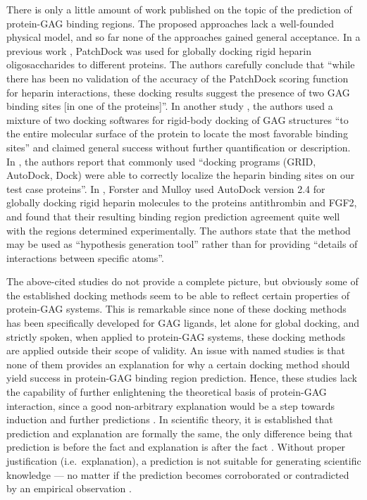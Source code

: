 There is only a little amount of work published on the topic of the prediction
of protein-GAG binding regions. The proposed approaches lack a well-founded
physical model, and so far none of the approaches gained general acceptance. In
a previous work \cite{gandhi_bmp_heparin_binding_sites_2012}, PatchDock
\cite{patchdock_2002} was used for globally docking rigid heparin
oligosaccharides to different proteins. The authors carefully conclude that
\enquote{while there has been no validation of the accuracy of the PatchDock
scoring function for heparin interactions, these docking results suggest the
presence of two GAG binding sites [in one of the proteins]}. In another study
\cite{rogers_gag_prot_prot_2011}, the authors used a mixture of two docking
softwares for rigid-body docking of GAG structures
\enquote{to the entire molecular surface of the protein to locate the most
favorable binding sites} and claimed general success without further
quantification or description. In \cite{bitomsky_gag_docking_1999}, the authors
report that commonly used
\enquote{docking programs (GRID, AutoDock, Dock) were able to
correctly localize the heparin binding sites on our test case proteins}. In
\cite{hp_binding_sites_mulloy_2006}, Forster and Mulloy used AutoDock version
2.4 \cite{autodock24} for globally docking rigid heparin molecules to the
proteins antithrombin and FGF2, and found that their resulting binding region
prediction agreement quite well with the regions determined experimentally. The
authors state that the method may be used as \enquote{hypothesis generation
tool} rather than for providing
\enquote{details of interactions between specific atoms}.

The above-cited studies do not provide a complete picture, but obviously some of
the established docking methods seem to be able to reflect certain properties of
protein-GAG systems. This is remarkable since none of these docking methods has
been specifically developed for GAG ligands, let alone for global docking, and
strictly spoken, when applied to protein-GAG systems, these docking methods are
applied outside their scope of validity. An issue with named studies is that
none of them provides an explanation for why a certain docking method should
yield success in protein-GAG binding region prediction. Hence, these studies
lack the capability of further enlightening the theoretical basis of protein-GAG
interaction, since a good non-arbitrary explanation would be a step towards
induction and further predictions \cite{swirski2007literature}. In scientific
theory, it is established that prediction and explanation are formally the same,
the only difference being that prediction is before the fact and explanation is
after the fact \cite{suppe1977structure}. Without proper justification (i.e.\
explanation), a prediction is not suitable for generating scientific knowledge
--- no matter if the prediction becomes corroborated or contradicted by an
empirical observation \cite{schafersman_scientific_method}.

